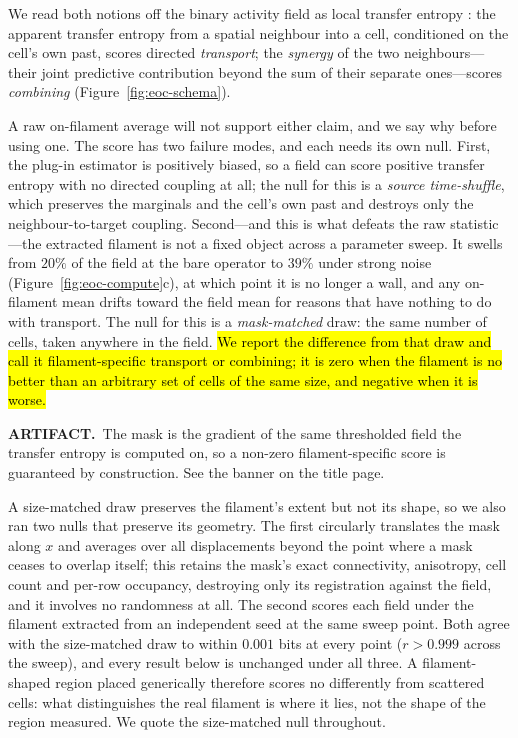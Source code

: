 \documentclass[man,12pt,floatsintext,donotrepeattitle]{apa7}
\newcommand{\artifact}[1]{{\sethlcolor{markArtifact}\hl{#1}}}
\newcommand{\flagged}[3]{%
  \par\vspace{3pt}\noindent
  \colorbox{#1}{\parbox{\dimexpr\linewidth-2\fboxsep\relax}{%
    \footnotesize\textbf{#2}\ #3}}%
  \par\vspace{3pt}}
\begin{document}
We read both notions off the binary activity field as local transfer entropy
\parencite{lizier2008local}: the apparent transfer entropy from a spatial
neighbour into a cell, conditioned on the cell's own past, scores directed
\emph{transport}; the \emph{synergy} of the two neighbours---their joint
predictive contribution beyond the sum of their separate ones---scores
\emph{combining} (Figure~\ref{fig:eoc-schema}).

A raw on-filament average will not support either claim, and we say why before
using one. The score has two failure modes, and each needs its own null. First,
the plug-in estimator is positively biased, so a field can score positive
transfer entropy with no directed coupling at all; the null for this is a
\emph{source time-shuffle}, which preserves the marginals and the cell's own
past and destroys only the neighbour-to-target coupling. Second---and this is
what defeats the raw statistic---the extracted filament is not a fixed object
across a parameter sweep. It swells from $20\%$ of the field at the bare
operator to $39\%$ under strong noise (Figure~\ref{fig:eoc-compute}c), at which
point it is no longer a wall, and any on-filament mean drifts toward the field
mean for reasons that have nothing to do with transport. The null for this is a
\emph{mask-matched} draw: the same number of cells, taken anywhere in the
field. \artifact{We report the difference from that draw and call it
filament-specific transport or combining; it is zero when the filament is no
better than an arbitrary set of cells of the same size, and negative when it is
worse.}
\flagged{markArtifact}{ARTIFACT.}{The mask is the gradient of the same
thresholded field the transfer entropy is computed on, so a non-zero
filament-specific score is guaranteed by construction. See the banner on the
title page.}

A size-matched draw preserves the filament's extent but not its shape, so we
also ran two nulls that preserve its geometry. The first circularly translates
the mask along $x$ and averages over all displacements beyond the point where a
mask ceases to overlap itself; this retains the mask's exact connectivity,
anisotropy, cell count and per-row occupancy, destroying only its registration
against the field, and it involves no randomness at all. The second scores each
field under the filament extracted from an independent seed at the same sweep
point. Both agree with the size-matched draw to within $0.001$ bits at every
point ($r > 0.999$ across the sweep), and every result below is unchanged under
all three. A filament-shaped region placed generically therefore scores no
differently from scattered cells: what distinguishes the real filament is where
it lies, not the shape of the region measured. We quote the size-matched null
throughout.
\end{document}
